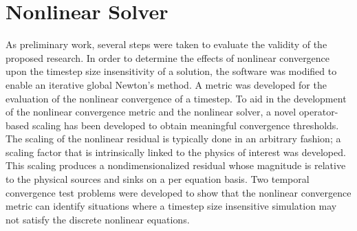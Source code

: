 \chapter{Nonlinear Solver}
\label{chap:nln_solver}
As preliminary work, several steps were taken to evaluate the validity of the proposed research.
In order to determine the effects of nonlinear convergence upon the timestep size insensitivity of a solution, the \cobra{} software was modified to enable an iterative global Newton's method.
A metric was developed for the evaluation of the nonlinear convergence of a timestep.
To aid in the development of the nonlinear convergence metric and the nonlinear solver, a novel operator-based scaling has been developed to obtain meaningful convergence thresholds.
The scaling of the nonlinear residual is typically done in an arbitrary fashion; a scaling factor that is intrinsically linked to the physics of interest was developed.
This scaling produces a nondimensionalized residual whose magnitude is relative to the physical sources and sinks on a per equation basis. 
Two temporal convergence test problems were developed to show that the nonlinear convergence metric can identify situations where a timestep size insensitive simulation may not satisfy the discrete nonlinear equations.
